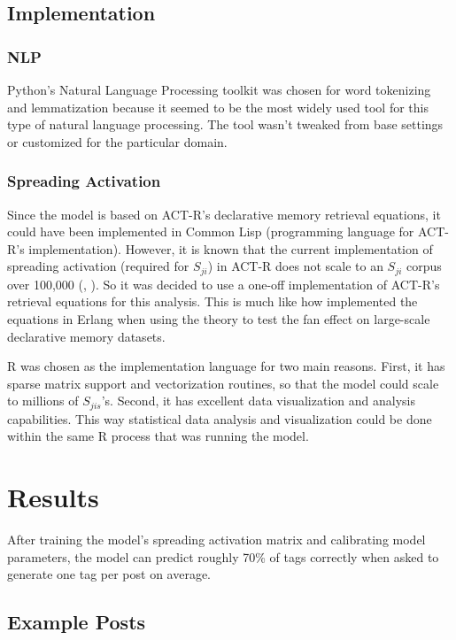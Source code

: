 \documentclass[10pt,letterpaper]{article}
\begin{document}
\subsection{Implementation}

\subsubsection{NLP}

Python's Natural Language Processing toolkit was chosen for word tokenizing and lemmatization because it seemed to be the most widely used tool for this type of natural language processing.
The tool wasn't tweaked from base settings or customized for the particular domain.

\subsubsection{Spreading Activation}

Since the model is based on ACT-R's declarative memory retrieval equations, it could have been implemented in Common Lisp (programming language for ACT-R's implementation).
However, it is known that the current implementation of spreading activation (required for $S_{ji}$) in ACT-R does not scale to an $S_{ji}$ corpus over 100,000 (\cite{Douglass1998}, \cite{Douglass2007}).
So it was decided to use a one-off implementation of ACT-R's retrieval equations for this analysis.
This is much like how \cite{Douglass2007} implemented the equations in Erlang when using the theory to test the fan effect on large-scale declarative memory datasets.

R was chosen as the implementation language for two main reasons.
First, it has sparse matrix support and vectorization routines, so that the model could scale to millions of $S_{jis}$'s.
Second, it has excellent data visualization and analysis capabilities. 
This way statistical data analysis and visualization could be done within the same R process that was running the model. 

\section{Results}

After training the model's spreading activation matrix and calibrating model parameters, the model can predict roughly 70\% of tags correctly when asked to generate one tag per post on average.

\subsection{Example Posts}
\end{document}

